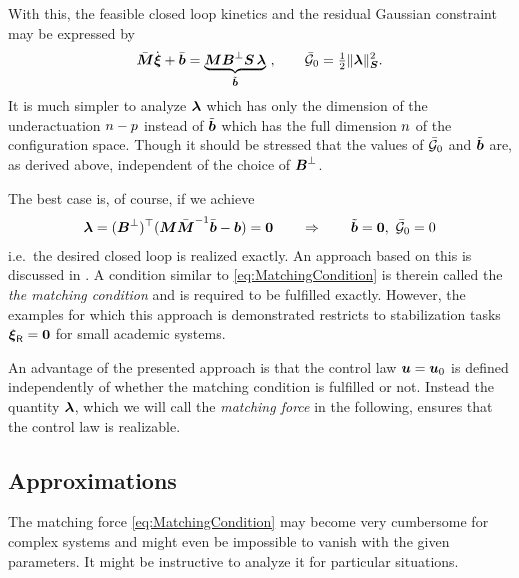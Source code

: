 With this, the feasible closed loop kinetics and the residual Gaussian constraint may be expressed by
\begin{align}
 \sysInertiaMatC\sysVeld + \sysForceC = \underbrace{\sysInertiaMat \sysInputMatLComp \mat{S} \, \tuple{\lambda}}_{\tilde{\sysForce}} \ ,
\qquad
 \GaussianConstraintC_0 = \tfrac{1}{2} \norm[\mat{S}]{\tuple{\lambda}}^2.
\end{align}
It is much simpler to analyze $\tuple{\lambda}$ which has only the dimension of the underactuation $\dimConfigSpace-\numInputs$ instead of $\tilde{\tuple{b}}$ which has the full dimension $\dimConfigSpace$ of the configuration space.
Though it should be stressed that the values of $\GaussianConstraintC_0$ and $\tilde{\tuple{b}}$ are, as derived above, independent of the choice of $\sysInputMatLComp$.

The best case is, of course, if we achieve 
\begin{align}\label{eq:MatchingCondition}
 \tuple{\lambda} = (\sysInputMatLComp)^\top (\sysInertiaMat \sysInertiaMatC^{-1} \sysForceC - \sysForce) = \tuple{0}
\qquad \Rightarrow \qquad
 \tilde{\tuple{b}} = \tuple{0}, \ \GaussianConstraintC_0 = 0
\end{align}
i.e.\ the desired closed loop is realized exactly.
An approach based on this is discussed in \cite{bloch2000controlled}.
A condition similar to \eqref{eq:MatchingCondition} is therein called the \textit{the matching condition} and is required to be fulfilled exactly.
However, the examples for which this approach is demonstrated restricts to stabilization tasks $\sysVelR = \tuple{0}$ for small academic systems.

An advantage of the presented approach is that the control law $\sysInput = \sysInput_0$ is defined independently of whether the matching condition is fulfilled or not.
Instead the quantity $\tuple{\lambda}$, which we will call the \textit{matching force} in the following, ensures that the control law is realizable.

\subsection{Approximations}
The matching force \eqref{eq:MatchingCondition} may become very cumbersome for complex systems and might even be impossible to vanish with the given parameters.
It might be instructive to analyze it for particular situations.

